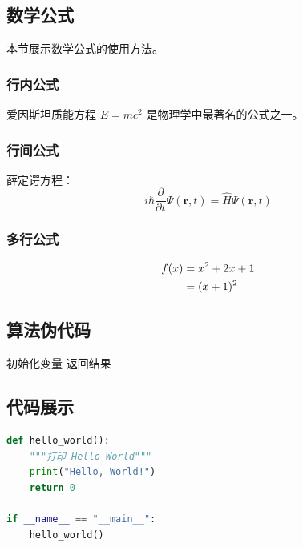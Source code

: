 \documentclass[12pt, a4paper]{article}
\begin{document}
\subsection{数学公式}
\label{sec:math}

本节展示数学公式的使用方法。

\subsubsection{行内公式}
爱因斯坦质能方程 $E=mc^2$ 是物理学中最著名的公式之一。

\subsubsection{行间公式}
薛定谔方程：
\begin{equation}
    i\hbar\frac{\partial}{\partial t}\Psi(\mathbf{r},t) = \hat{H}\Psi(\mathbf{r},t)
    \label{eq:schrodinger}
\end{equation}

\subsubsection{多行公式}
\begin{align}
    f(x) &= x^2 + 2x + 1 \notag \\
         &= (x+1)^2 \label{eq:factorization}
\end{align}

\subsection{算法伪代码}
\label{sec:algorithm}

\begin{algorithm}
    \SetAlgoLined
    初始化变量\;
    返回结果\;
    \caption{示例算法}
    \label{algo:example}
\end{algorithm}

\subsection{代码展示}
\label{sec:code}

\begin{lstlisting}[language=Python, caption=Python 代码示例]
def hello_world():
    """打印 Hello World"""
    print("Hello, World!")
    return 0

if __name__ == "__main__":
    hello_world()
\end{lstlisting}
\end{document}
